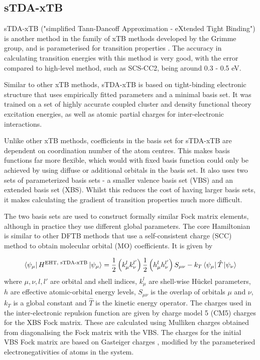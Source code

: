 \subsection{sTDA-xTB}
\label{subsec:stda_xtb}
sTDA-xTB ("simplified Tann-Dancoff Approximation - eXtended Tight Binding") is another
method in the family of xTB methods developed by the Grimme group, and is parameterised
for transition properties \cite{Grimme2016}. The accuracy in calculating transition energies with this
method is very good, with the error compared to high-level method, such as SCS-CC2,
being around 0.3 - 0.5 eV.

Similar to other xTB methods, sTDA-xTB is based on tight-binding electronic structure
that uses empirically fitted parameters and a minimal basis set. It was trained 
on a set of highly accurate coupled cluster and density functional theory excitation 
energies, as well as atomic partial charges for inter-electronic interactions.

Unlike other xTB methods, coefficients in the basis set for sTDA-xTB are dependent
on coordination number of the atom centres. This makes basis functions far more 
flexible, which would with fixed basis function could only be achieved by using 
diffuse or additional orbitals in the basis set. It also uses two sets of parameterized 
basis sets - a smaller valence basis set (VBS) and an extended basis set (XBS).
Whilst this reduces the cost of having larger basis sets, it makes calculating the
gradient of transition properties much more difficult.

The two basis sets are used to construct formally similar Fock matrix elements,
although in practice they use different global parameters. The core Hamiltonian
is similar to other DFTB methods that use a self-consistent charge (SCC) method 
to obtain molecular orbital (MO) coefficients. It is given by

\begin{equation}
\bra{\psi_\mu} H^{\text{EHT, sTDA-xTB}} \ket{\psi_\mu}= \frac{1}{2} \left(k^l_\mu k^{l'}_\nu\right) \frac{1}{2} \left(h^l_\mu h^{l'}_\nu\right) S_{\mu\nu} - k_T \bra{\psi_\mu}\hat{T}\ket{\psi_\nu}
\end{equation}
%
where $\mu,\nu,l,l'$ are orbital and shell indices, $k^l_\mu$ are shell-wise 
H{\"u}ckel parameters, $h$ are effective atomic-orbital energy levels, $S_{\mu\nu}$
is the overlap of orbitals $\mu$ and $\nu$, $k_T$ is a global constant and $\hat{T}$
is the kinetic energy operator. The charges used in the inter-electronic repulsion 
function are given by charge model 5 (CM5) \cite{Marenich2012} charges for the XBS
Fock matrix. These are calculated using Mulliken charges obtained from diagonalising
the Fock matrix with the VBS. The charges for the initial VBS Fock matrix are based
on Gasteiger charges \cite{Gasteiger1978}, modified by the parameterised
electronegativities of atoms in the system.

